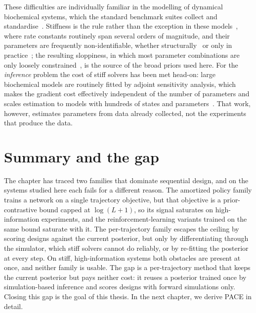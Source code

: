 These difficulties are individually familiar in the modelling of dynamical biochemical systems,
which the standard benchmark suites collect and standardise~\citep{hass2019benchmark}. Stiffness is
the rule rather than the exception in these models~\citep{stadter2021benchmarking}, where rate
constants routinely span several orders of magnitude, and their parameters are frequently
non-identifiable, whether structurally~\citep{villaverde2016structural} or only in
practice~\citep{raue2009identifiability}; the resulting sloppiness, in which most parameter
combinations are only loosely constrained~\citep{gutenkunst2007universally}, is the source of the
broad priors used here. For the \emph{inference} problem the cost of stiff solvers has been met
head-on: large biochemical models are routinely fitted by adjoint sensitivity analysis, which
makes the gradient cost effectively independent of the number of parameters and scales estimation
to models with hundreds of states and parameters~\citep{froehlich2017scalable}. That work,
however, estimates parameters from data already collected, not the experiments that produce the data.


\section{Summary and the gap}
\label{sec:rw-gap}

The chapter has traced two families that dominate sequential design, and on the systems
studied here each fails for a different reason. The amortized policy family trains a network
on a single trajectory objective, but that objective is a prior-contrastive bound capped at
$\log(L+1)$, so its signal saturates on high-information experiments, and the
reinforcement-learning variants trained on the same bound saturate with it. The per-trajectory
family escapes the ceiling by scoring designs against the current posterior, but only by
differentiating through the simulator, which stiff solvers cannot do reliably, or by re-fitting
the posterior at every step. On stiff, high-information systems both obstacles are present at
once, and neither family is usable. The gap is a per-trajectory method that keeps the current
posterior but pays neither cost: it reuses a posterior trained once by simulation-based
inference and scores designs with forward simulations only. Closing this gap is the goal of
this thesis. In the next chapter, we derive PACE in detail.
